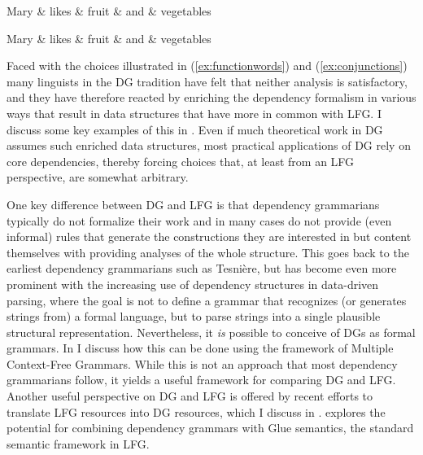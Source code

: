 \documentclass[output=paper,hidelinks]{langscibook}
\begin{document}
\begin{exe}
  \ex\label{ex:conjunctions}
  \begin{dependency}[baseline=-0.6ex,theme=simple]
    \begin{deptext}
      Mary \& likes \& fruit \& and \& vegetables\\
    \end{deptext}
  \end{dependency}
  \begin{dependency}[baseline=-0.6ex,theme=simple]
    \begin{deptext}
      Mary \& likes \& fruit \& and \& vegetables\\
    \end{deptext}
  \end{dependency}
\end{exe}

Faced with the choices illustrated in (\ref{ex:functionwords}) and
(\ref{ex:conjunctions}) many linguists in the DG tradition have felt
that neither analysis is satisfactory, and they have therefore reacted
by enriching the dependency formalism in various ways that result in
data structures that have more in common with LFG. I discuss some key
examples of this in .  Even if much
theoretical work in DG assumes such enriched data structures, most
practical applications of DG rely on core dependencies, thereby
forcing choices that, at least from an LFG perspective, are somewhat
arbitrary.

One key difference between DG and LFG is that dependency
grammarians typically do not formalize their work and in many cases do
not provide (even informal) rules that generate the constructions they
are interested in but content themselves with providing analyses of
the whole structure. This goes back to the earliest dependency
grammarians such as Tesnière, but has become even more prominent with
the increasing use of dependency structures in data-driven parsing,
where the goal is not to define a grammar that recognizes (or
generates strings from) a formal language, but to parse strings into a
single plausible structural representation. Nevertheless, it \emph{is}
possible to conceive of DGs as formal grammars. In
 I discuss how this can be done using the
framework of Multiple Context-Free Grammars. While this is not an
approach that most dependency grammarians follow, it yields a useful 
framework for comparing DG and LFG. Another useful perspective on DG
and LFG is offered by recent efforts to translate LFG resources into
DG resources, which I discuss in .
 explores the potential for combining
dependency grammars with Glue semantics, the standard semantic
framework in LFG.
\end{document}

